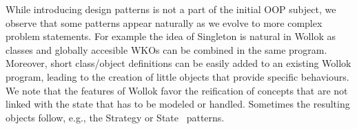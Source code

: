 While introducing design patterns is not a part of the initial OOP subject, we observe that some patterns appear naturally as we evolve to more complex problem statements.
For example the idea of Singleton is natural in  Wollok as classes and globally accesible WKOs can be combined in the same program. Moreover, short class/object definitions can be easily added to an existing Wollok program, leading to the creation of little objects that provide specific behaviours. We note that the features of Wollok favor the reification of concepts that are not linked with the state that has to be modeled or handled. Sometimes the resulting objects follow, e.g., the Strategy or State~\cite{Gamm93b} patterns.

